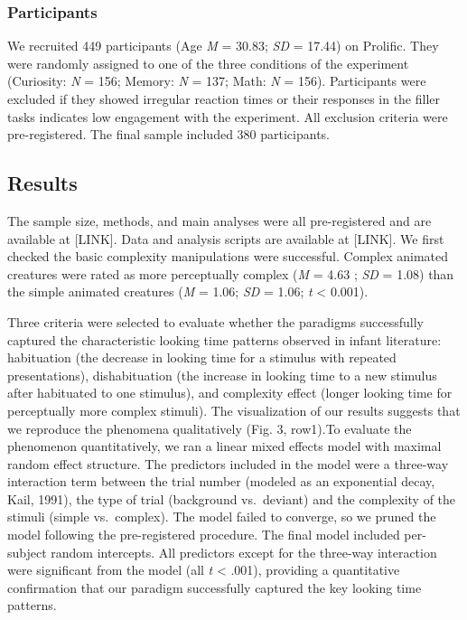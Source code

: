 \documentclass[10pt, letterpaper]{article}
\begin{document}
\hypertarget{participants}{%
\subsubsection{Participants}\label{participants}}

We recruited 449 participants (Age \emph{M} = 30.83; \emph{SD} = 17.44)
on Prolific. They were randomly assigned to one of the three conditions
of the experiment (Curiosity: \emph{N} = 156; Memory: \emph{N} = 137;
Math: \emph{N} = 156). Participants were excluded if they showed
irregular reaction times or their responses in the filler tasks
indicates low engagement with the experiment. All exclusion criteria
were pre-registered. The final sample included 380 participants.

\hypertarget{results}{%
\subsection{Results}\label{results}}

The sample size, methods, and main analyses were all pre-registered and
are available at {[}LINK{]}. Data and analysis scripts are available at
{[}LINK{]}. We first checked the basic complexity manipulations were
successful. Complex animated creatures were rated as more perceptually
complex (\emph{M} = 4.63 ; \emph{SD} = 1.08) than the simple animated
creatures (\emph{M} = 1.06; \emph{SD} = 1.06; \emph{t} \textless{}
0.001).

Three criteria were selected to evaluate whether the paradigms
successfully captured the characteristic looking time patterns observed
in infant literature: habituation (the decrease in looking time for a
stimulus with repeated presentations), dishabituation (the increase in
looking time to a new stimulus after habituated to one stimulus), and
complexity effect (longer looking time for perceptually more complex
stimuli). The visualization of our results suggests that we reproduce
the phenomena qualitatively (Fig. 3, row1).To evaluate the phenomenon
quantitatively, we ran a linear mixed effects model with maximal random
effect structure. The predictors included in the model were a three-way
interaction term between the trial number (modeled as an exponential
decay, Kail, 1991), the type of trial (background vs.~deviant) and the
complexity of the stimuli (simple vs.~complex). The model failed to
converge, so we pruned the model following the pre-registered procedure.
The final model included per-subject random intercepts. All predictors
except for the three-way interaction were significant from the model
(all \emph{t} \textless{} .001), providing a quantitative confirmation
that our paradigm successfully captured the key looking time patterns.
\end{document}
